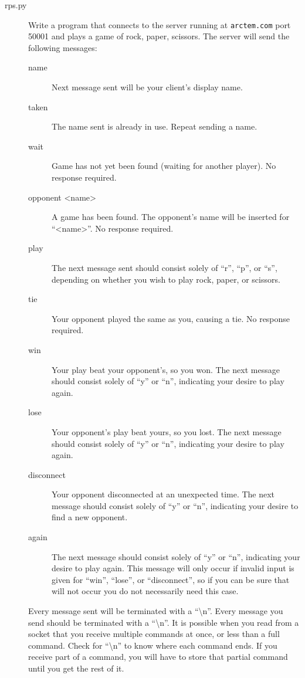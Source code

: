 \documentclass[11pt]{cselabheader}
\begin{document}
\begin{description}
\item[rps.py] Write a program that connects to the server running at
  \lstinline{arctem.com} port 50001 and plays a game of rock, paper, scissors. The server
  will send the following messages:

  \begin{description}
    \item[name] Next message sent will be your client's display name.
    \item[taken] The name sent is already in use. Repeat sending a name.
    \item[wait] Game has not yet been found (waiting for another player). No
      response required.
    \item[opponent <name>] A game has been found. The opponent's name will be
      inserted for ``<name>''. No response required.
    \item[play] The next message sent should consist solely of ``r'', ``p'', or
      ``s'', depending on whether you wish to play rock, paper, or scissors.
    \item[tie] Your opponent played the same as you, causing a tie. No response
      required.
    \item[win] Your play beat your opponent's, so you won. The next
      message should consist solely of ``y'' or ``n'', indicating your desire to
      play again.
    \item[lose] Your opponent's play beat yours, so you lost. The next message
      should consist solely of ``y'' or ``n'', indicating your desire to play
      again.  
    \item[disconnect] Your opponent disconnected at an unexpected time.  The
      next message should consist solely of ``y'' or ``n'', indicating your
      desire to find a new opponent.
    \item[again] The next message should consist solely of ``y'' or ``n'',
      indicating your desire to play again. This message will only occur if
      invalid input is given for ``win'', ``lose'', or ``disconnect'', so if
      you can be sure that will not occur you do not necessarily need this
      case.
  \end{description}

  Every message sent will be terminated with a ``\textbackslash{}n''. Every message you send
  should be terminated with a ``\textbackslash{}n''. It is possible when you read from a socket
  that you receive multiple commands at once, or less than a full command. Check
  for ``\textbackslash{}n'' to know where each command ends. If you receive part of a command, you
  will have to store that partial command until you get the rest of it.


\end{description}
\end{document}
